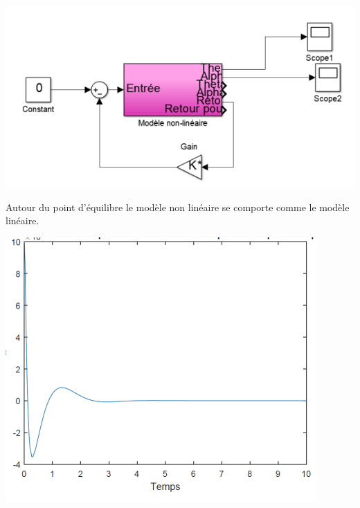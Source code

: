 \documentclass[12pt, a4paper, openany]{report}
\begin{document}
\begin{center}
{\includegraphics[scale=0.6]{fig3.png}}
\label{fiig3}
\end{center}

     Autour du point d’équilibre le modèle non linéaire se comporte comme le modèle linéaire.   


\begin{center}
{\includegraphics[scale=0.6]{fig4.png}}
\label{fiig4} 
\end{center}
\end{document}
